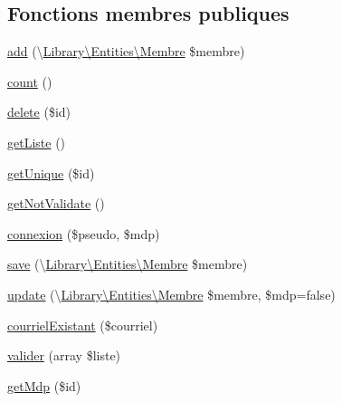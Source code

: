 \subsection*{Fonctions membres publiques}
\begin{DoxyCompactItemize}
\item 
\hyperlink{class_library_1_1_models_1_1_membre_manager_af804544a7b5bdf26b8ff64e2067768ec}{add} (\textbackslash{}\hyperlink{class_library_1_1_entities_1_1_membre}{Library\textbackslash{}\+Entities\textbackslash{}\+Membre} \$membre)
\item 
\hyperlink{class_library_1_1_models_1_1_membre_manager_ac751e87b3d4c4bf2feb03bee8b092755}{count} ()
\item 
\hyperlink{class_library_1_1_models_1_1_membre_manager_a2f8258add505482d7f00ea26493a5723}{delete} (\$id)
\item 
\hyperlink{class_library_1_1_models_1_1_membre_manager_a20b3a2f576f3ea746f769779a329491e}{get\+Liste} ()
\item 
\hyperlink{class_library_1_1_models_1_1_membre_manager_ab94c8b937a2aa55fce0bb7f77f68c00e}{get\+Unique} (\$id)
\item 
\hyperlink{class_library_1_1_models_1_1_membre_manager_a779790ed69a6d4db56de26e189202ecb}{get\+Not\+Validate} ()
\item 
\hyperlink{class_library_1_1_models_1_1_membre_manager_aa564555e5f523593ac65f5209c900bfd}{connexion} (\$pseudo, \$mdp)
\item 
\hyperlink{class_library_1_1_models_1_1_membre_manager_a5fee3dc3d5ff81b96167081512a9642d}{save} (\textbackslash{}\hyperlink{class_library_1_1_entities_1_1_membre}{Library\textbackslash{}\+Entities\textbackslash{}\+Membre} \$membre)
\item 
\hyperlink{class_library_1_1_models_1_1_membre_manager_a8237876cfd9696bc2f93e2d67d23640b}{update} (\textbackslash{}\hyperlink{class_library_1_1_entities_1_1_membre}{Library\textbackslash{}\+Entities\textbackslash{}\+Membre} \$membre, \$mdp=false)
\item 
\hyperlink{class_library_1_1_models_1_1_membre_manager_aea0f712c0b27fbe5644ca17cc4dca6aa}{courriel\+Existant} (\$courriel)
\item 
\hyperlink{class_library_1_1_models_1_1_membre_manager_aa6b82e38583e652b2506a45dce4b5480}{valider} (array \$liste)
\item 
\hyperlink{class_library_1_1_models_1_1_membre_manager_a429b6cd9fcd955208060b4601c205393}{get\+Mdp} (\$id)
\end{DoxyCompactItemize}
